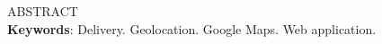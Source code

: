 
\begin{resumo}[ABSTRACT]
\begin{SingleSpacing}


ABSTRACT \\

\textbf{Keywords}: Delivery. Geolocation. Google Maps. Web application.

\end{SingleSpacing}
\end{resumo}